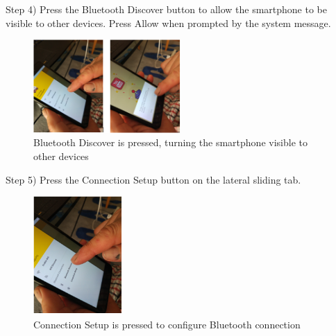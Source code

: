 Step 4) Press the Bluetooth Discover button to allow the smartphone to be visible to other devices. Press Allow when prompted by the system message.
%
\begin{figure}[!hbt]
\centering
\includegraphics[width=0.5\textwidth]{img/val4.png}
\caption{\label{fig:val4}Bluetooth Discover is pressed, turning the smartphone visible to other devices}
\end{figure}
%

Step 5) Press the Connection Setup button on the lateral sliding tab.
%
\begin{figure}[!hbt]
\centering
\includegraphics[width=0.3\textwidth]{img/val5.png}
\caption{\label{fig:val5}Connection Setup is pressed to configure Bluetooth connection}
\end{figure}
%

